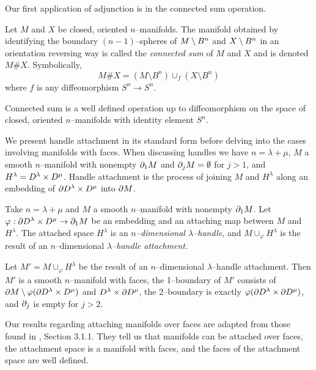 Our first application of adjunction is in the connected sum operation.

\begin{defn}
	Let $M$ and $X$ be closed, oriented $n$--manifolds.
	The manifold obtained by identifying the boundary $(n-1)$--spheres of $M\setminus B^n$ and $X\setminus B^n$ in an orientation reversing way is called the \emph{connected sum} of $M$ and $X$ and is denoted $M\# X$.
	Symbolically,
	\[
		M\# X = (M\setminus B^n)\cup_f (X\setminus B^n)
	\]
	where $f$ is any diffeomorphism $S^n\to S^n$.
\end{defn}

\begin{prop}
	Connected sum is a well defined operation up to diffeomorphism on the space of closed, oriented $n$--manifolds with identity element $S^n$.
\end{prop}

We present handle attachment in its standard form before delving into the cases involving manifolds with faces.
When discussing handles we have $n=\lambda+\mu$, $M$ a smooth $n$--manifold with nonempty $\partial_1 M$ and $\partial_j M=\emptyset$ for $j>1$, and $H^\lambda = D^\lambda\times D^\mu$.
Handle attachment is the process of joining $M$ and $H^\lambda$ along an embedding of $\partial D^\lambda\times D^\mu$ into $\partial M$.

\begin{defn}[Handle]
	\label{def:handle}
	Take $n=\lambda+\mu$ and $M$ a smooth $n$--manifold with nonempty $\partial_1 M$.
	Let $\varphi:\partial D^\lambda\times D^\mu\to\partial_1 M$ be an embedding and an attaching map between $M$ and $H^\lambda$.
	The attached space $H^\lambda$ is an \emph{$n$--dimensional $\lambda$--handle}, and $M\cup_\varphi H^\lambda$ is the result of an $n$--dimensional \emph{$\lambda$--handle attachment}.
\end{defn}

\begin{prop}
	\label{prop:handle}
	Let $M'=M\cup_\varphi H^\lambda$ be the result of an $n$--dimensional $\lambda$--handle attachment.
	Then $M'$ is a smooth $n$--manifold with faces, the 1--boundary of $M'$ consists of $\partial M\setminus\varphi(\partial D^\lambda\times D^\mu)$ and $D^\lambda\times\partial D^\mu$, the 2--boundary is exactly $\varphi(\partial D^\lambda\times\partial D^\mu)$, and $\partial_j$ is empty for $j>2$.
\end{prop}

Our results regarding attaching manifolds over faces are adapted from those found in \cite{JSP}, Section 3.1.1.
They tell us that manifolds can be attached over faces, the attachment space is a manifold with faces, and the faces of the attachment space are well defined.

